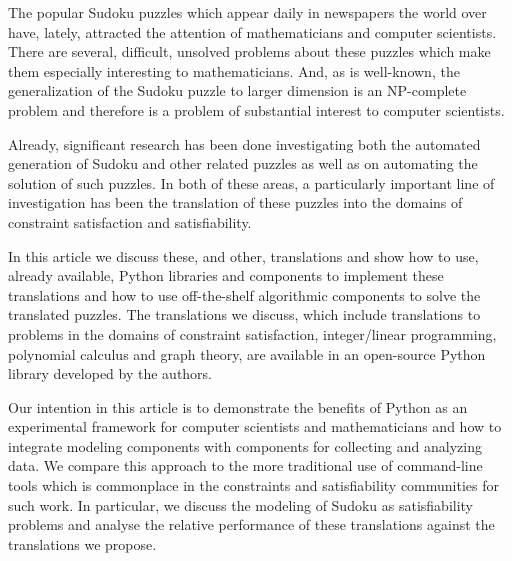 The popular Sudoku puzzles which appear daily in newspapers the world over have, lately, attracted the attention of mathematicians and computer scientists. There are several, difficult, unsolved problems about these puzzles which make them especially interesting to mathematicians. And, as is well-known, the generalization of the Sudoku puzzle to larger dimension is an NP-complete problem and therefore is a problem of substantial interest to computer scientists.

Already, significant research has been done investigating both the automated generation of Sudoku and other related puzzles as well as on automating the solution of such puzzles. In both of these areas, a particularly important line of investigation has been the translation of these puzzles into the domains of constraint satisfaction and satisfiability.

In this article we discuss these, and other, translations and show how to use, already available, Python libraries and components to implement these translations and how to use off-the-shelf algorithmic components to solve the translated puzzles. The translations we discuss, which include translations to problems in the domains of constraint satisfaction, integer/linear programming, polynomial calculus and graph theory, are available in an open-source Python library developed by the authors.

Our intention in this article is to demonstrate the benefits of Python as an experimental framework for computer scientists and mathematicians and how to integrate modeling components with components for collecting and analyzing data. We compare this approach to the more traditional use of command-line tools which is commonplace in the constraints and satisfiability communities for such work. In particular, we discuss the modeling of Sudoku as satisfiability problems and analyse the relative performance of these translations against the translations we propose.

